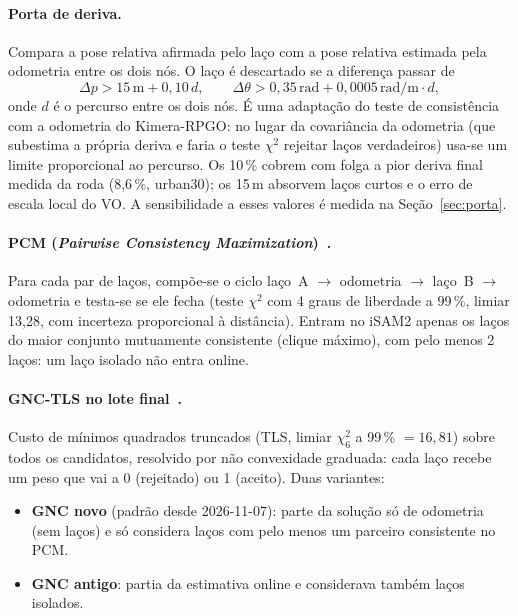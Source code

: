 \documentclass[11pt,a4paper]{article}
\begin{document}
\paragraph{Porta de deriva.} Compara a pose relativa afirmada pelo laço com a pose relativa estimada pela odometria entre
os dois nós. O laço é descartado se a diferença passar de
\[
  \Delta p > 15\,\text{m} + 0{,}10\,d, \qquad \Delta\theta > 0{,}35\,\text{rad} + 0{,}0005\,\text{rad/m}\cdot d,
\]
onde $d$ é o percurso entre os dois nós. É uma adaptação do teste de consistência com a odometria do
Kimera-RPGO: no lugar da covariância da odometria (que subestima a própria deriva e faria o teste $\chi^2$ rejeitar
laços verdadeiros) usa-se um limite proporcional ao percurso. Os 10\,\% cobrem com folga a pior deriva final medida da
roda (8,6\,\%, urban30); os 15\,m absorvem laços curtos e o erro de escala local do VO. A sensibilidade a esses valores
é medida na Seção~\ref{sec:porta}.

\paragraph{PCM (\emph{Pairwise Consistency Maximization})~\cite{mangelson2018pcm}.} Para cada par de laços, compõe-se o
ciclo laço~A $\to$ odometria $\to$ laço~B $\to$ odometria e testa-se se ele fecha (teste $\chi^2$ com 4 graus de
liberdade a 99\,\%, limiar 13,28, com incerteza proporcional à distância). Entram no iSAM2 apenas os laços do maior
conjunto mutuamente consistente (clique máximo), com pelo menos 2 laços: um laço isolado não entra online.

\paragraph{GNC-TLS no lote final~\cite{yang2020gnc}.} Custo de mínimos quadrados truncados (TLS, limiar
$\chi^2_6$ a 99\,\% $=16{,}81$) sobre todos os candidatos, resolvido por não convexidade graduada: cada laço recebe um
peso que vai a 0 (rejeitado) ou 1 (aceito). Duas variantes:
\begin{itemize}
  \item \textbf{GNC novo} (padrão desde 2026-11-07): parte da solução só de odometria (sem laços) e só considera laços
        com pelo menos um parceiro consistente no PCM.
  \item \textbf{GNC antigo}: partia da estimativa online e considerava também laços isolados.
\end{itemize}

\end{document}
